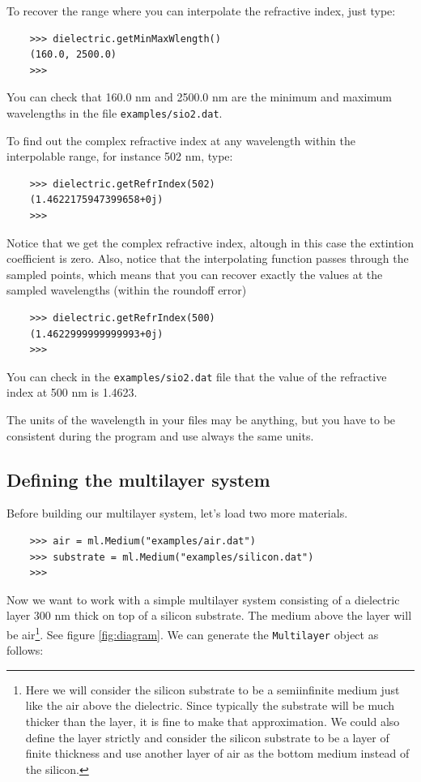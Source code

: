 \documentclass[a4paper,11pt,aps,final]{revtex4}
\begin{document}
To recover the range where you can interpolate the refractive index, just type:

\begin{verbatim}
    >>> dielectric.getMinMaxWlength()
    (160.0, 2500.0)
    >>>
\end{verbatim}

You can check that 160.0 nm and 2500.0 nm are the minimum and maximum wavelengths in the file \texttt{examples/sio2.dat}.

To find out the complex refractive index at any wavelength within the interpolable range, for instance 502 nm, type:

\begin{verbatim}
    >>> dielectric.getRefrIndex(502)
    (1.4622175947399658+0j)
    >>>
\end{verbatim}

Notice that we get the complex refractive index, altough in this case the extintion coefficient is zero. Also, notice that the interpolating function passes through the sampled points, which means that you can recover exactly the values at the sampled wavelengths (within the roundoff error)

\begin{verbatim}
    >>> dielectric.getRefrIndex(500)
    (1.4622999999999993+0j)
    >>>
\end{verbatim}

You can check in the \texttt{examples/sio2.dat} file that the value of the refractive index at 500 nm is 1.4623.

The units of the wavelength in your files may be anything, but you have to be consistent during the program and use always the same units.

\subsection{Defining the multilayer system} \label{sub:define_multilayer}

Before building our multilayer system, let's load two more materials.

\begin{verbatim}
    >>> air = ml.Medium("examples/air.dat")
    >>> substrate = ml.Medium("examples/silicon.dat")
    >>>
\end{verbatim}

Now we want to work with a simple multilayer system consisting of a dielectric layer 300 nm thick on top of a silicon substrate. The medium above the layer will be air\footnote{Here we will consider the silicon substrate to be a semiinfinite medium just like the air above the dielectric. Since typically the substrate will be much thicker than the layer, it is fine to make that approximation. We could also define the layer strictly and consider the silicon substrate to be a layer of finite thickness and use another layer of air as the bottom medium instead of the silicon.}. See figure \ref{fig:diagram}. We can generate the \texttt{Multilayer} object as follows:
\end{document}
